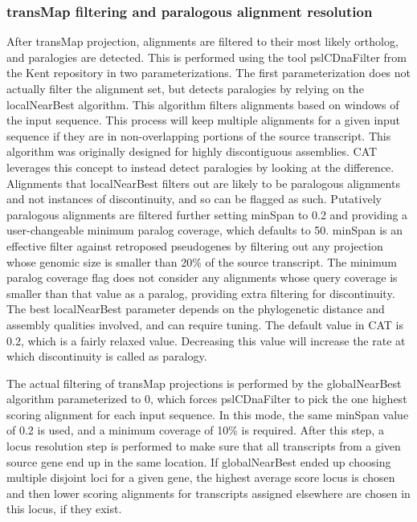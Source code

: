 \documentclass[fleqn,10pt]{wlscirep}
\begin{document}
\subsubsection*{transMap filtering and paralogous alignment resolution}
	After transMap projection, alignments are filtered to their most likely ortholog, and paralogies are detected. This is performed using the tool pslCDnaFilter from the Kent repository in two parameterizations. The first parameterization does not actually filter the alignment set, but detects paralogies by relying on the localNearBest algorithm. This algorithm filters alignments based on windows of the input sequence. This process will keep multiple alignments for a given input sequence if they are in non-overlapping portions of the source transcript. This algorithm was originally designed for highly discontiguous assemblies. CAT leverages this concept to instead detect paralogies by looking at the difference. Alignments that localNearBest filters out are likely to be paralogous alignments and not instances of discontinuity, and so can be flagged as such. Putatively paralogous alignments are filtered further setting minSpan to 0.2 and providing a user-changeable minimum paralog coverage, which defaults to 50. minSpan is an effective filter against retroposed pseudogenes by filtering out any projection whose genomic size is smaller than 20\% of the source transcript. The minimum paralog coverage flag does not consider any alignments whose query coverage is smaller than that value as a paralog, providing extra filtering for discontinuity. The best localNearBest parameter depends on the phylogenetic distance and assembly qualities involved, and can require tuning. The default value in CAT is 0.2, which is a fairly relaxed value. Decreasing this value will increase the rate at which discontinuity is called as paralogy.
    
	The actual filtering of transMap projections is performed by the globalNearBest algorithm parameterized to 0, which forces pslCDnaFilter to pick the one highest scoring alignment for each input sequence. In this mode, the same minSpan value of 0.2 is used, and a minimum coverage of 10\% is required. After this step, a locus resolution step is performed to make sure that all transcripts from a given source gene end up in the same location. If globalNearBest ended up choosing multiple disjoint loci for a given gene, the highest average score locus is chosen and then lower scoring alignments for transcripts assigned elsewhere are chosen in this locus, if they exist.
\end{document}
